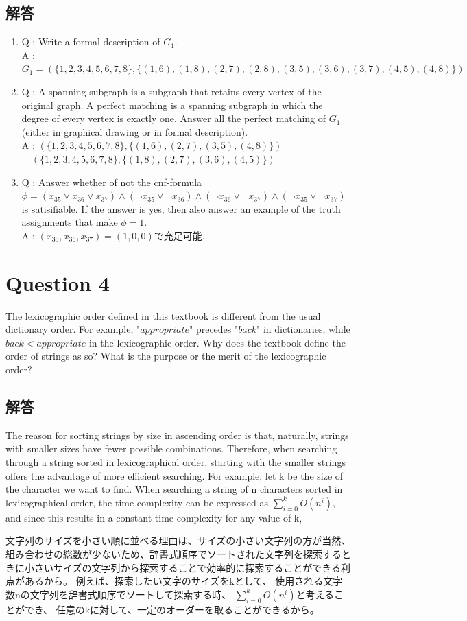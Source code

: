 \documentclass[uplatex,a4paper,11pt]{jsarticle}
\begin{document}
\subsection*{解答}
\begin{enumerate}
      \item Q : Write a formal description of $G_1$. \\
            A : $G_1 = (\{1,2,3,4,5,6,7,8\}, \{(1,6),(1,8),(2,7),(2,8),(3,5),(3,6),(3,7),(4,5),(4,8)\})$
      \item Q : A spanning subgraph is a subgraph that retains every vertex of the original graph. A perfect matching is a spanning subgraph in which the degree of every vertex is exactly one. Answer all the perfect matching of $G_1$
                  (either in graphical drawing or in formal description).  \\
            A : $(\{1,2,3,4,5,6,7,8\}, \{(1,6),(2,7),(3,5),(4,8)\})$ \\
                  \quad \ \ $(\{1,2,3,4,5,6,7,8\},\{(1,8),(2,7),(3,6),(4,5)\})$
      \item Q : Answer whether of not the cnf-formula \\
                  $\phi = (x_{35} \lor x_{36} \lor x_{37}) \land (\neg x_{35} \lor \neg x_{36}) \land (\neg x_{36} \lor \neg x_{37}) \land (\neg x_{35} \lor \neg x_{37})$ \\
                  is satisifiable. If the answer is yes, then also answer an example of the truth assignments that make $\phi = 1$. \\
            A : $(x_{35}, x_{36}, x_{37}) = (1,0,0)$で充足可能.
\end{enumerate}

\section*{Question 4}
The lexicographic order defined in this textbook is different from the usual dictionary order. For example, "$appropriate$"
precedes "$back$" 
in dictionaries, while $back < appropriate$
in the lexicographic order. Why does the textbook define the order of strings as so? What is the purpose or the merit of the lexicographic order?

\subsection*{解答}
The reason for sorting strings by size in ascending order is that, naturally, strings with smaller sizes have fewer possible combinations. Therefore, when searching through a string sorted in lexicographical order, starting with the smaller strings offers the advantage of more efficient searching.
For example, let k be the size of the character we want to find.
When searching a string of n characters sorted in lexicographical order,
the time complexity can be expressed as $\sum_{i=0}^{k}{O(n^i)}$,
and since this results in a constant time complexity for any value of k,

文字列のサイズを小さい順に並べる理由は、サイズの小さい文字列の方が当然、組み合わせの総数が少ないため、辞書式順序でソートされた文字列を探索するときに小さいサイズの文字列から探索することで効率的に探索することができる利点があるから。
例えば、探索したい文字のサイズをkとして、
使用される文字数nの文字列を辞書式順序でソートして探索する時、
$\sum_{i=0}^{k}{O(n^i)}$と考えることができ、
任意のkに対して、一定のオーダーを取ることができるから。
\end{document}
